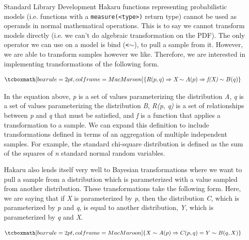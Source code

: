 \documentclass[22pt]{beamer}
\begin{document}
\begin{frame}[fragile]
\begin{textblock}{5}
\begin{textblock}{5}
\begin{block}{Standard Library Development}
\tiny{Hakaru functions representing probabilistic models (i.e. functions with a {\tt \tiny{measure(<type>)}} return type) cannot be used as operands in normal mathematical operations. This is to say we cannot transform models directly (i.e. we can’t do algebraic transformation on the PDF). The only operator we can use on a model is bind ({\tt \tiny{<$\sim$}}), to pull a sample from it. However, we are able to transform samples however we like. Therefore, we are interested in implementing transformations of the following form.}

\begin{equation*}
\begin{aligned}
& \tcboxmath[boxrule=2pt,colframe=MacMaroon]{R(p, q) \Rightarrow \textit{X} \sim A(p) \Rightarrow \textit{f(X)} \sim B(q)}
\end{aligned}
\end{equation*}

\bigskip

\tiny{In the equation above, \textit{p} is a set of values parameterizing the distribution \textit{A}}, \textit{q} is a set of values parameterizing the distribution \textit{B}, \textit{R(p, q)} is a set of relationships between \textit{p} and \textit{q} that must be satisfied, and \textit{f} is a function that applies a transformation to a sample. We can expand this definition to include transformations defined in terms of an aggregation of multiple independent samples. For example, the standard chi-square distribution is defined as the sum of the squares of \textit{n} standard normal random variables. 

\bigskip

\tiny{Hakaru also lends itself very well to Bayesian transformations where we want to pull a sample from a distribution which is parameterized with a value sampled from another distribution. These transformations take the following form. Here, we are saying that if \textit{X} is parameterized by \textit{p}, then the distribution \textit{C}, which is parameterized by \textit{p} and \textit{q}, is equal to another distribution, \textit{Y}, which is parameterized by \textit{q} and \textit{X}.}

\begin{equation*}
\begin{aligned}
& \tcboxmath[boxrule=2pt,colframe=MacMaroon]{X \sim A(p) \Rightarrow C(p, q) = Y \sim B(q, X)}
\end{aligned}
\end{equation*}


\end{block}
\end{textblock}
\end{textblock}
\end{frame}
\end{document}
